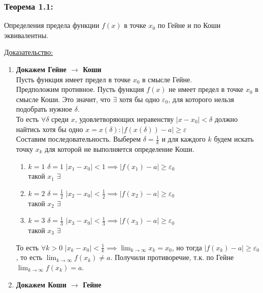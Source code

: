 \documentclass[12pt]{article}
\begin{document}
    \subsubsection*{Теорема 1.1:}
    Определения предела функции $f(x)$ в точке $x_0$ по Гейне и по Коши эквивалентны.\par\noindent
    \underline{Доказательство:}
    \begin{adjustwidth}{1.5em}{1.5em}
        \begin{enumerate}
            \item \textbf{Докажем Гейне $\rightarrow$ Коши}\\
            Пусть функция имеет предел в точке $x_0$ в смысле Гейне.\\
            Предположим противное. Пусть функция $f(x)$ не имеет предел в точке $x_0$ в смысле Коши. Это значит, что $\exists$ хотя бы одно $\varepsilon_0$, для которого нельзя подобрать нужное $\delta$.\\
            То есть $\forall \delta$ среди $x$, удовлетворяющих неравенству $|x-x_0| < \delta$ должно найтись хотя бы одно $x = x(\delta) : |f(x(\delta)) - a| \ge \varepsilon$\\
            Составим последовательность. Выберем $\delta = \frac{1}{k}$ и для каждого $k$ будем искать точку $x_k$ для которой не выполняется определение Коши.
            \begin{enumerate}
                \item $k = 1$ $\delta = 1$ $|x_1 - x_0| < 1 \implies |f(x_1) - a| \ge \varepsilon_0$\\
                такой $x_1$ $\exists$
                \item $k = 2$ $\delta = \frac{1}{2}$ $|x_2 - x_0| < \frac{1}{2} \implies |f(x_2) - a| \ge \varepsilon_0$\\
                такой $x_2$ $\exists$
                \item $k = 3$ $\delta = \frac{1}{3}$ $|x_3 - x_0| < \frac{1}{3} \implies |f(x_3) - a| \ge \varepsilon_0$\\
                такой $x_3$ $\exists$
            \end{enumerate}
            То есть $\forall k > 0$ $|x_k - x_0| < \frac{1}{k} \implies \lim_{k\to\infty} x_k = x_0$, но тогда $|f(x_k) - a| \ge \varepsilon_0$, то есть $\lim_{k\to\infty} f(x_k) \ne a$. Получили противоречие, т.к. по Гейне $\lim_{k\to\infty} f(x_k) = a$.
            \item \textbf{Докажем Коши $\rightarrow$ Гейне}\\

\end{enumerate}
\end{adjustwidth}
\end{document}

